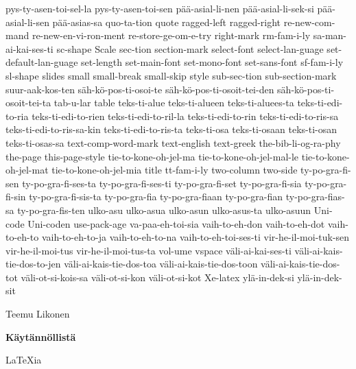 \documentclass{book}
\begin{document}
{  pys-ty-asen-toi-sel-la
  pys-ty-asen-toi-sen
  pää-asial-li-nen
  pää-asial-li-sek-si
  pää-asial-li-sen
  pää-asias-sa
  quo-ta-tion
  quote
  ragged-left
  ragged-right
  re-new-com-mand
  re-new-en-vi-ron-ment
  re-store-ge-om-e-try
  right-mark
  rm-fam-i-ly
  sa-man-ai-kai-ses-ti
  sc-shape
  Scale
  sec-tion
  section-mark
  select-font
  select-lan-guage
  set-default-lan-guage
  set-length
  set-main-font
  set-mono-font
  set-sans-font
  sf-fam-i-ly
  sl-shape
  slides
  small
  small-break
  small-skip
  style
  sub-sec-tion
  sub-section-mark
  suur-aak-kos-ten
  säh-kö-pos-ti-osoi-te
  säh-kö-pos-ti-osoit-tei-den
  säh-kö-pos-ti-osoit-tei-ta
  tab-u-lar
  table
  teks-ti-alue
  teks-ti-alueen
  teks-ti-aluees-ta
  teks-ti-edi-to-ria
  teks-ti-edi-to-rien
  teks-ti-edi-to-ril-la
  teks-ti-edi-to-rin
  teks-ti-edi-to-ris-sa
  teks-ti-edi-to-ris-sa-kin
  teks-ti-edi-to-ris-ta
  teks-ti-osa
  teks-ti-osaan
  teks-ti-osan
  teks-ti-osas-sa
  text-comp-word-mark
  text-english
  text-greek
  the-bib-li-og-ra-phy
  the-page
  this-page-style
  tie-to-kone-oh-jel-ma
  tie-to-kone-oh-jel-mal-le
  tie-to-kone-oh-jel-mat
  tie-to-kone-oh-jel-mia
  title
  tt-fam-i-ly
  two-column
  two-side
  ty-po-gra-fi-sen
  ty-po-gra-fi-ses-ta
  ty-po-gra-fi-ses-ti
  ty-po-gra-fi-set
  ty-po-gra-fi-sia
  ty-po-gra-fi-sin
  ty-po-gra-fi-sis-ta
  ty-po-gra-fia
  ty-po-gra-fiaan
  ty-po-gra-fian
  ty-po-gra-fias-sa
  ty-po-gra-fis-ten
  ulko-asu
  ulko-asua
  ulko-asun
  ulko-asus-ta
  ulko-asuun
  Uni-code
  Uni-coden
  use-pack-age
  va-paa-eh-toi-sia
  vaih-to-eh-don
  vaih-to-eh-dot
  vaih-to-eh-to
  vaih-to-eh-to-ja
  vaih-to-eh-to-na
  vaih-to-eh-toi-ses-ti
  vir-he-il-moi-tuk-sen
  vir-he-il-moi-tus
  vir-he-il-moi-tus-ta
  vol-ume
  vspace
  väli-ai-kai-ses-ti
  väli-ai-kais-tie-dos-to-jen
  väli-ai-kais-tie-dos-toa
  väli-ai-kais-tie-dos-toon
  väli-ai-kais-tie-dos-tot
  väli-ot-si-kois-sa
  väli-ot-si-kon
  väli-ot-si-kot
  Xe-latex
  ylä-in-dek-si
  ylä-in-dek-sit
}

\pagestyle{empty}




\vspace*{.2\textheight}

{

  \setlength{\parindent}{0pt}

  \fontsize{14bp}{14bp}\rmfamily Teemu Likonen

  \fontsize{48bp}{48bp}\sffamily\bfseries%
  \hspace{-3bp}%
  Käytännöllistä

  \fontsize{60bp}{60bp}\selectfont%
  \hspace{-5bp}%
  \LaTeX{}ia

}
\end{document}
